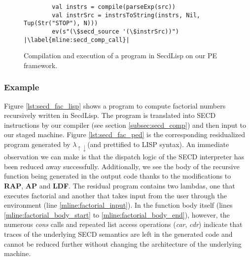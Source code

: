 \documentclass[a4paper,12pt,twoside,openright]{report}
\theoremstyle{definition}
\newcommand{\mslang}{$\lambda_{\uparrow\downarrow}$}
\newcommand{\secdlisp}{SecdLisp}
\begin{document}
\begin{figure}[htp!]
\centering
\begin{verbatim}
        val instrs = compile(parseExp(src))
        val instrSrc = instrsToString(instrs, Nil, Tup(Str("STOP"), N)))
        ev(s"(\$secd_source '(\$instrSrc))") |\label{mline:secd_comp_call}|
\end{verbatim}
\caption{Compilation and execution of a program in \secdlisp{} on our PE framework.}
\label{lst:secd_comp_ex1}
\end{figure}

\subsubsection{Example}
Figure \ref{lst:secd_fac_lisp} shows a program to compute factorial numbers recursively written in \secdlisp. The program is translated into SECD instructions by our compiler (see section \ref{subsec:secd_comp}) and then input to our staged machine. Figure \ref{lst:secd_fac_ped} is the corresponding residualized program generated by \mslang (and prettified to LISP syntax). An immediate observation we can make is that the dispatch logic of the SECD interpreter has been reduced away successfully. Additionally, we see the body of the recursive function being generated in the output code thanks to the modifications to \textbf{RAP}, \textbf{AP} and \textbf{LDF}. The residual program contains two lambdas, one that executes factorial and another that takes input from the user through the environment (line \ref{mline:factorial_input}). In the function body itself (lines \ref{mline:factorial_body_start} to \ref{mline:factorial_body_end}), however, the numerous \textit{cons} calls and repeated list access operations (\textit{car}, \textit{cdr}) indicate that traces of the underlying SECD semantics are left in the generated code and cannot be reduced further without changing the architecture of the underlying machine.
\end{document}
